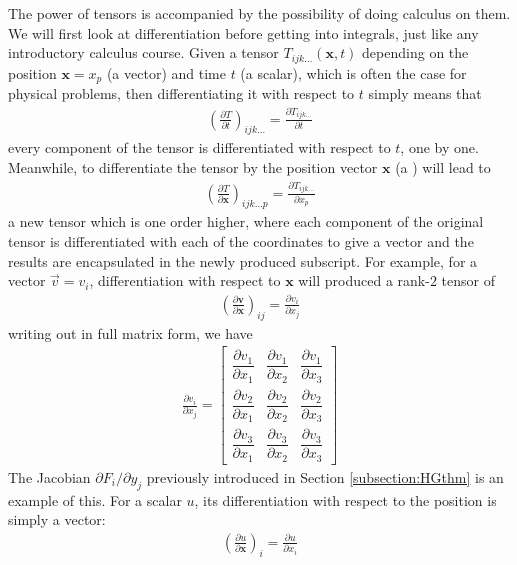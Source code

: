 The power of tensors is accompanied by the possibility of doing calculus on them. We will first look at differentiation before getting into integrals, just like any introductory calculus course. Given a tensor $T_{ijk\ldots}(\textbf{x}, t)$ depending on the position $\textbf{x} = x_p$ (a vector) and time $t$ (a scalar), which is often the case for physical problems, then differentiating it with respect to $t$ simply means that
\begin{align}
\left(\frac{\partial T}{\partial t}\right)_{ijk\ldots} = \frac{\partial T_{ijk\ldots}}{\partial t}
\end{align}
every component of the tensor is differentiated with respect to $t$, one by one. Meanwhile, to differentiate the tensor by the position vector $\textbf{x}$ (a ) will lead to
\begin{align}
\left(\frac{\partial T}{\partial \textbf{x}}\right)_{ijk\ldots p} = \frac{\partial T_{ijk\ldots}}{\partial x_p}
\end{align}
a new tensor which is one order higher, where each component of the original tensor is differentiated with each of the coordinates to give a vector and the results are encapsulated in the newly produced subscript. For example, for a vector $\vec{v} = v_i$, differentiation with respect to $\textbf{x}$ will produced a rank-$2$ tensor of
\begin{align}
\left(\frac{\partial \textbf{v}}{\partial \textbf{x}}\right)_{ij} = \frac{\partial v_i}{\partial x_j} \label{eqn:vectortensdiff}
\end{align}
writing out in full matrix form, we have
\begin{align}
\frac{\partial v_i}{\partial x_j} = 
\begin{bmatrix}
\dfrac{\partial v_1}{\partial x_1} & \dfrac{\partial v_1}{\partial x_2} & \dfrac{\partial v_1}{\partial x_3} \\[10pt]
\dfrac{\partial v_2}{\partial x_1} & \dfrac{\partial v_2}{\partial x_2} & \dfrac{\partial v_2}{\partial x_3} \\[10pt]
\dfrac{\partial v_3}{\partial x_1} & \dfrac{\partial v_3}{\partial x_2} & \dfrac{\partial v_3}{\partial x_3} 
\end{bmatrix}
\end{align}
The Jacobian $\partial F_i/\partial y_j$ previously introduced in Section \ref{subsection:HGthm} is an example of this. For a scalar $u$, its differentiation with respect to the position is simply a vector:
\begin{align}
\left(\frac{\partial u}{\partial \textbf{x}}\right)_i = \frac{\partial u}{\partial x_i}
\end{align}
